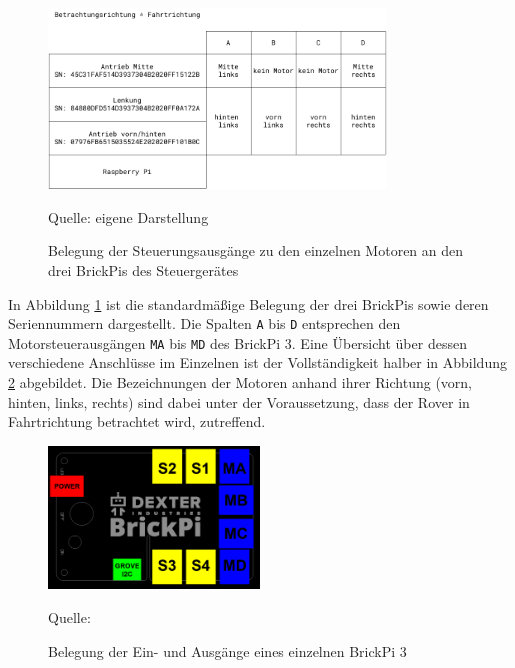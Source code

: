 \begin{figure} %
	\centering
	\includegraphics[width=0.8\textwidth]{../Images/brickpiconfig.pdf}
	\vspace{0.5em}
	\parbox[c]{0.8\linewidth}{\footnotesize
		\centering
		\vspace{1em}
		Quelle: eigene Darstellung
	}
	\caption{Belegung der Steuerungsausgänge zu den einzelnen Motoren an den drei BrickPis des Steuergerätes}
	\label{fig:brickpistack}
\end{figure}

In Abbildung \ref{fig:brickpistack} ist die standardmäßige Belegung der drei BrickPis sowie deren Seriennummern dargestellt.
Die Spalten \texttt{A} bis \texttt{D} entsprechen den Motorsteuerausgängen \texttt{MA} bis \texttt{MD} des BrickPi 3.
Eine Übersicht über dessen verschiedene Anschlüsse im Einzelnen ist der Vollständigkeit halber in Abbildung \ref{fig:brickpi3ports} abgebildet.
Die Bezeichnungen der Motoren anhand ihrer Richtung (vorn, hinten, links, rechts) sind dabei unter der Voraussetzung, dass der Rover in Fahrtrichtung betrachtet wird, zutreffend.

\begin{figure}
	\centering
	\includegraphics[width=0.5\textwidth]{../Images/BrickPi3-Port-Layout.png}
	\vspace{0.5em}
	\parbox[c]{0.8\linewidth}{\footnotesize
		\centering
		\vspace{1em}
		Quelle: \cite{dexter2017}
	}
	\caption{Belegung der Ein- und Ausgänge eines einzelnen BrickPi 3}
	\label{fig:brickpi3ports}
\end{figure}

